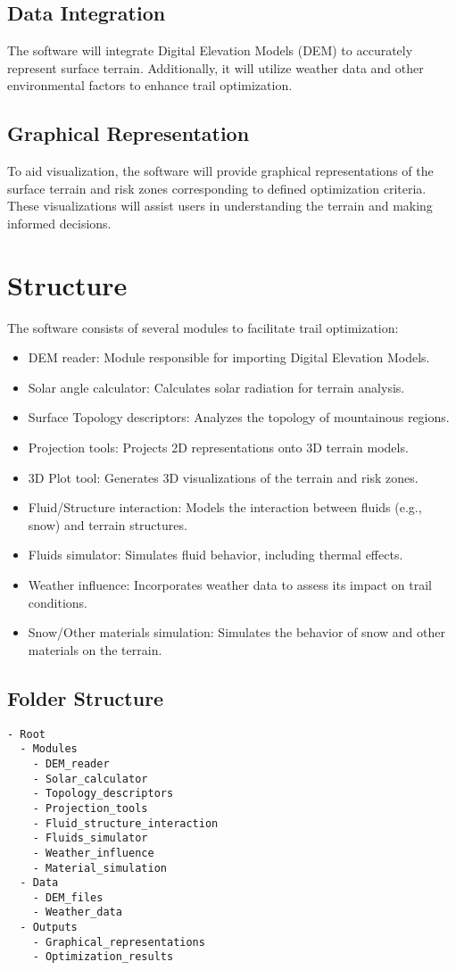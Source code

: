 \documentclass{article}
\begin{document}
\subsection{Data Integration}
The software will integrate Digital Elevation Models (DEM) to accurately represent surface terrain. Additionally, it will utilize weather data and other environmental factors to enhance trail optimization.

\subsection{Graphical Representation}
To aid visualization, the software will provide graphical representations of the surface terrain and risk zones corresponding to defined optimization criteria. These visualizations will assist users in understanding the terrain and making informed decisions.

\section{Structure}
The software consists of several modules to facilitate trail optimization:
\begin{itemize}
    \item DEM reader: Module responsible for importing Digital Elevation Models.
    \item Solar angle calculator: Calculates solar radiation for terrain analysis.
    \item Surface Topology descriptors: Analyzes the topology of mountainous regions.
    \item Projection tools: Projects 2D representations onto 3D terrain models.
    \item 3D Plot tool: Generates 3D visualizations of the terrain and risk zones.
    \item Fluid/Structure interaction: Models the interaction between fluids (e.g., snow) and terrain structures.
    \item Fluids simulator: Simulates fluid behavior, including thermal effects.
    \item Weather influence: Incorporates weather data to assess its impact on trail conditions.
    \item Snow/Other materials simulation: Simulates the behavior of snow and other materials on the terrain.
\end{itemize}

\subsection{Folder Structure}
\begin{verbatim}
- Root
  - Modules
    - DEM_reader
    - Solar_calculator
    - Topology_descriptors
    - Projection_tools
    - Fluid_structure_interaction
    - Fluids_simulator
    - Weather_influence
    - Material_simulation
  - Data
    - DEM_files
    - Weather_data
  - Outputs
    - Graphical_representations
    - Optimization_results
\end{verbatim}
\end{document}
